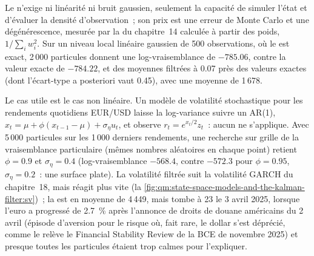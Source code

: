 Le  n'exige ni linéarité ni bruit gaussien, seulement la capacité de simuler l'état et d'évaluer la densité d'observation~; son prix est
une erreur de Monte Carlo et une dégénérescence, mesurée par la  du chapitre~14 calculée à partir des poids, $1/\sum_iw_i^2$. Sur un niveau local linéaire gaussien
de 500 observations, où le  est exact, 2\,000 particules donnent une log-vraisemblance de $-785.06$, contre la valeur exacte de $-784.22$, et des moyennes filtrées
à 0.07 près des valeurs exactes (dont l'écart-type a posteriori vaut 0.45), avec une  moyenne de 1\,678.

Le cas utile est le cas non linéaire. Un modèle de volatilité stochastique pour les rendements quotidiens EUR/USD laisse la log-variance suivre un AR(1), $x_t = \mu + \phi(x_{t-1} - \mu)
+ \sigma_\eta u_t$, et observe $r_t = e^{x_t/2}z_t$~: aucun  ne s'applique. Avec 5\,000 particules sur les 1\,000 derniers rendements, une recherche sur grille de la
vraisemblance particulaire (mêmes nombres aléatoires en chaque point) retient $\phi = 0.9$ et $\sigma_\eta = 0.4$ (log-vraisemblance $-568.4$, contre $-572.3$ pour $\phi = 0.95$,
$\sigma_\eta = 0.2$~: une surface plate). La volatilité filtrée suit la volatilité GARCH du chapitre~18, mais réagit plus vite
(la \cref{fig:qm:state-space-models-and-the-kalman-filter:sv})~; la  est en moyenne de 4\,449, mais tombe à 23 le 3 avril 2025, lorsque l'euro a progressé de 2.7~\%
après l'annonce de droits de douane américains du 2 avril (épisode d'aversion pour le risque où, fait rare, le dollar s'est déprécié, comme le relève le Financial Stability Review de la BCE de novembre
2025) et presque toutes les particules étaient trop calmes pour l'expliquer.

